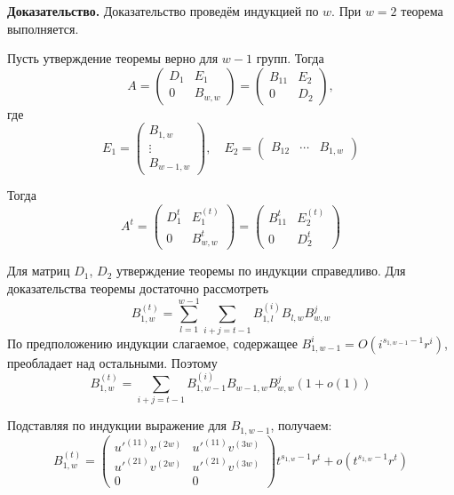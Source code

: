 \documentclass[11pt]{article}
\begin{document}
\textbf{Доказательство.} Доказательство проведём индукцией по $w$. При $w = 2$ теорема выполняется.

Пусть утверждение теоремы верно для $w-1$ групп. Тогда
\begin{equation}
    A = 
    \begin{pmatrix}
        D_1 & E_1 \\
        0 & B_{w,w}
    \end{pmatrix}
    =
    \begin{pmatrix}
        B_{11} & E_2 \\
        0 & D_2
    \end{pmatrix},
\end{equation}
где
\begin{equation}
    E_1 = 
    \begin{pmatrix}
        B_{1,w} \\
        \vdots \\
        B_{w-1,w}
    \end{pmatrix},
    \quad{}E_2 = 
    \begin{pmatrix}
        B_{12} & \cdots & B_{1,w}
    \end{pmatrix}
\end{equation}

Тогда
\begin{equation}
    A^t = 
    \begin{pmatrix}
        D_1^t & E_1^{(t)} \\
        0 & B_{w,w}^t
    \end{pmatrix}
    =
    \begin{pmatrix}
        B_{11}^t & E_2^{(t)} \\
        0 & D_2^t
    \end{pmatrix}
\end{equation}

Для матриц $D_1$, $D_2$ утверждение теоремы по индукции справедливо. Для доказательства теоремы достаточно рассмотреть
\begin{equation}
    B_{1,w}^{(t)} = \sum_{l = 1}^{w-1} \sum_{i + j = t-1} B_{1,l}^{(i)} B_{l,w} B_{w,w}^j
\end{equation}
По предположению индукции слагаемое, содержащее $B_{1,w-1}^i = O(i^{s_{1,w-1} - 1} r^i)$, преобладает над остальными. Поэтому
\begin{equation}
    B_{1,w}^{(t)} = \sum_{i + j = t-1} B_{1,w-1}^{(i)} B_{w-1,w} B_{w,w}^j (1 + o(1))
\end{equation}

Подставляя по индукции выражение для $B_{1,w-1}$, получаем:
\begin{equation}
    B_{1,w}^{(t)} = 
    \begin{pmatrix}
        u'^{(11)} v^{(2w)} & u'^{(11)} v^{(3w)} \\
        u'^{(21)} v^{(2w)} & u'^{(21)} v^{(3w)} \\
        0 & 0
    \end{pmatrix}
    t^{s_{1,w} - 1} r^t + o(t^{s_{1,w}-1} r^t)
\end{equation}
\end{document}
